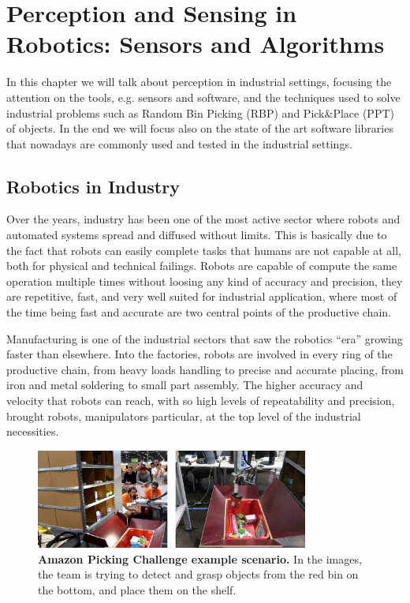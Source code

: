 \chapter{Perception and Sensing in Robotics: Sensors and Algorithms}\label{ch:perceptionandsensing}
In this chapter we will talk about perception in industrial settings, focusing the attention on the tools, e.g. sensors and software, and the techniques used to solve industrial problems such as Random Bin Picking (RBP) and Pick\&Place (PPT) of objects. In the end we will focus also on the state of the art software libraries that nowadays are commonly used and tested in the industrial settings.

\section{Robotics in Industry}\label{sec:roboticsinindustry}
Over the years, industry has been one of the most active sector where robots and automated systems spread and diffused without limits. This is basically due to the fact that robots can easily complete tasks that humans are not capable at all, both for physical and technical failings. Robots are capable of compute the same operation multiple times without loosing any kind of accuracy and precision, they are repetitive, fast, and very well suited for industrial application, where most of the time being fast and accurate are two central points of the productive chain.

Manufacturing is one of the industrial sectors that saw the robotics ``era'' growing faster than elsewhere. Into the factories, robots are involved in every ring of the productive chain, from heavy loads handling to precise and accurate placing, from iron and metal soldering to small part assembly. The higher accuracy and velocity that robots can reach, with so high levels of repeatability and precision, brought robots, manipulators particular, at the top level of the industrial necessities.

\begin{figure}
    \centering
    \includegraphics[width=0.8\textwidth]{figures/1_perception_and_sensing_in_robotics/amazon_picking_ch}
    \caption{\textbf{Amazon Picking Challenge example scenario.} In the images, the team is trying to detect and grasp objects from the red bin on the bottom, and place them on the shelf.} 
    \label{fig:amazon_picking_ch}
\end{figure}

